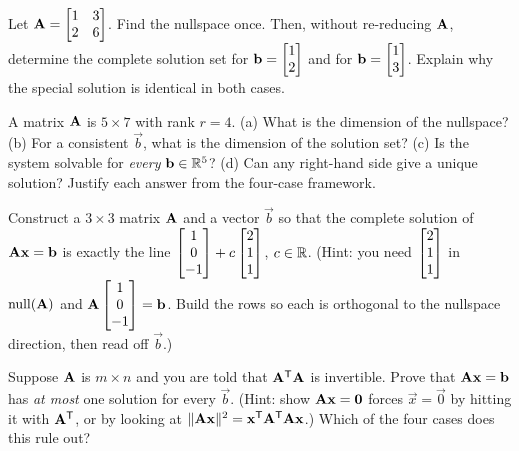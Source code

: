 \begin{exercise}
\label{ch13:ex-reuse}
Let $\mathbf{A}=\begin{bmatrix}1&3\\2&6\end{bmatrix}$. Find the nullspace once. Then, without
re-reducing $\mathbf{A}$, determine the complete solution set for
$\mathbf{b}=\begin{bmatrix}1\\2\end{bmatrix}$ and for $\mathbf{b}=\begin{bmatrix}1\\3\end{bmatrix}$. Explain why the special solution is
identical in both cases.
\end{exercise}

\begin{exercise}
\label{ch13:ex-shape}
A matrix $\mathbf{A}$ is $5\times7$ with rank $r=4$. (a) What is the dimension of the nullspace?
(b) For a consistent $\vec{b}$, what is the dimension of the solution set? (c) Is the system
solvable for \emph{every} $\mathbf{b}\in\mathbb{R}^5$? (d) Can any right-hand side give a unique
solution? Justify each answer from the four-case framework.
\end{exercise}

\begin{exercise}
\label{ch13:ex-prescribe}
Construct a $3\times3$ matrix $\mathbf{A}$ and a vector $\vec{b}$ so that the complete solution
of $\mathbf{A}\mathbf{x}=\mathbf{b}$ is exactly the line
$\begin{bmatrix}1\\0\\-1\end{bmatrix}+c\begin{bmatrix}2\\1\\1\end{bmatrix}$, $c\in\mathbb{R}$. (Hint: you need
$\begin{bmatrix}2\\1\\1\end{bmatrix}$ in $\operatorname{null}(\mathbf{A})$ and $\mathbf{A}\begin{bmatrix}1\\0\\-1\end{bmatrix}=\mathbf{b}$. Build the rows
so each is orthogonal to the nullspace direction, then read off $\vec b$.)
\end{exercise}

\begin{exercise}
\label{ch13:ex-criterion}
Suppose $\mathbf{A}$ is $m\times n$ and you are told that $\mathbf{A}^{\mathsf{T}}\mathbf{A}$ is invertible.
Prove that $\mathbf{A}\mathbf{x}=\mathbf{b}$ has \emph{at most} one solution for every $\vec{b}$.
(Hint: show $\mathbf{A}\mathbf{x}=\mathbf{0}$ forces $\vec{x}=\vec 0$ by hitting it with $\mathbf{A}^{\mathsf{T}}$,
or by looking at $\lVert\mathbf{A}\mathbf{x}\rVert^2=\mathbf{x}^{\mathsf{T}}\mathbf{A}^{\mathsf{T}}\mathbf{A}\mathbf{x}$.) Which of the four
cases does this rule out?
\end{exercise}
